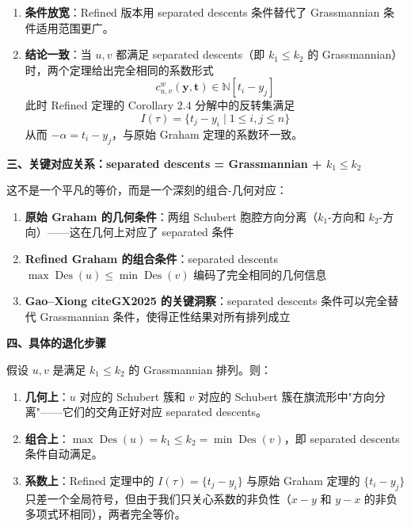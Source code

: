 \begin{enumerate}
\item \textbf{条件放宽}：Refined 版本用 separated descents 条件替代了 Grassmannian 条件适用范围更广。

\item \textbf{结论一致}：当 $u, v$ 都满足 separated descents（即 $k_1 \leq k_2$ 的 Grassmannian）时，两个定理给出完全相同的系数形式
$$c^w_{u,v}(\mathbf{y}, \mathbf{t}) \in \mathbb{N}[t_i - y_j]$$
此时 Refined 定理的 Corollary 2.4 分解中的反转集满足
$$I(\tau) = \{t_j - y_i \mid 1 \leq i,j \leq n\}$$
从而 $-\alpha = t_i - y_j$，与原始 Graham 定理的系数环一致。
\end{enumerate}

\textbf{三、关键对应关系：separated descents = Grassmannian + $k_1 \leq k_2$}

这不是一个平凡的等价，而是一个深刻的组合-几何对应：

\begin{enumerate}
\item \textbf{原始 Graham 的几何条件}：两组 Schubert 胞腔方向分离（$k_1$-方向和 $k_2$-方向）——这在几何上对应了 separated 条件

\item \textbf{Refined Graham 的组合条件}：separated descents $\max\operatorname{Des}(u) \leq \min\operatorname{Des}(v)$ 编码了完全相同的几何信息

\item \textbf{Gao--Xiong cite{GX2025} 的关键洞察}：separated descents 条件可以完全替代 Grassmannian 条件，使得正性结果对所有排列成立
\end{enumerate}

\textbf{四、具体的退化步骤}

假设 $u, v$ 是满足 $k_1 \leq k_2$ 的 Grassmannian 排列。则：

\begin{enumerate}
\item \textbf{几何上}：$u$ 对应的 Schubert 簇和 $v$ 对应的 Schubert 簇在旗流形中"方向分离"——它们的交角正好对应 separated descents。

\item \textbf{组合上}：$\max\operatorname{Des}(u) = k_1 \leq k_2 = \min\operatorname{Des}(v)$，即 separated descents 条件自动满足。

\item \textbf{系数上}：Refined 定理中的 $I(\tau) = \{t_j - y_i\}$ 与原始 Graham 定理的 $\{t_i - y_j\}$ 只差一个全局符号，但由于我们只关心系数的非负性（$x - y$ 和 $y - x$ 的非负多项式环相同），两者完全等价。
\end{enumerate}

